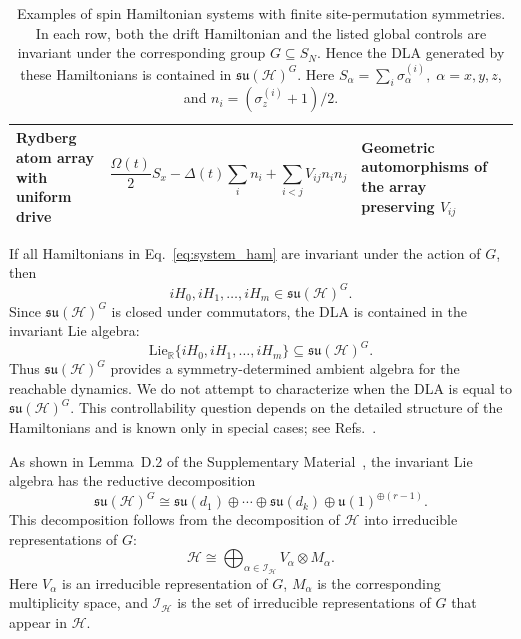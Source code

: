 \documentclass[10pt,twocolumn,superscriptaddress,aps,amsmath,amssymb,citeautoscript,floatfix,prx,longbibliography]{revtex4-2}
\newcounter{alg}
\theoremstyle{plain}
\theoremstyle{plain}
\theoremstyle{plain}
\theoremstyle{plain}
\theoremstyle{plain}
\theoremstyle{plain}
\begin{document}
\begin{table}[t]
\begin{tabular}{llll}
\parbox[t]{0.19\textwidth}{Rydberg atom array with uniform drive}
&
\parbox[t]{0.38\textwidth}{
\[
\frac{\Omega(t)}{2}S_x
-\Delta(t)\sum_i n_i
+\sum_{i<j}V_{ij}n_in_j
\]
}
&
\parbox[t]{0.22\textwidth}{
Geometric automorphisms of the array preserving \(V_{ij}\)
}
&
\parbox[t]{0.13\textwidth}{
\cite{Browaeys2020,Daley2022}
}
\\

\hline
\end{tabular}
\caption{
Examples of spin Hamiltonian systems with finite site-permutation symmetries. In each row, both the drift Hamiltonian and the listed global controls are invariant under the corresponding group \(G\subseteq S_N\). Hence the DLA generated by these Hamiltonians is contained in
\(\mathfrak{su}(\mathcal H)^G\). Here $S_{\alpha}=\sum_i \sigma_{\alpha}^{(i)}, \; \alpha=x, y, z$, and $n_i=\left(\sigma_z^{(i)}+1\right) / 2$.
}
\end{table}

If all Hamiltonians in Eq.~\eqref{eq:system_ham} are invariant under the action of $G$, then
$$
    iH_0,iH_1,\ldots,iH_m
    \in
    \mathfrak{su}(\mathcal H)^G .
$$
Since $\mathfrak{su}(\mathcal H)^G$ is closed under commutators, the DLA is contained in the invariant Lie algebra:
$$
    \mathrm{Lie}_{\mathbb R}
    \{iH_0,iH_1,\ldots,iH_m\}
    \subseteq
    \mathfrak{su}(\mathcal H)^G .
$$
Thus $\mathfrak{su}(\mathcal H)^G$ provides a symmetry-determined ambient algebra for the reachable dynamics. We do not attempt to characterize when the DLA is equal to $\mathfrak{su}(\mathcal H)^G$. This controllability question depends on the detailed structure of the Hamiltonians and is known only in special cases; see Refs.~\cite{Albertini2020, Kokcu2024, Wiersema2024}.

As shown in Lemma~D.2 of the Supplementary Material~\cite{SuppMat}, the invariant Lie algebra has the reductive decomposition
\begin{equation}\label{eq:inv_alg_decomp}
    \mathfrak{su}(\mathcal H)^G
    \cong
    \mathfrak{su}(d_1)
    \oplus
    \cdots
    \oplus
    \mathfrak{su}(d_k)
    \oplus
    \mathfrak{u}(1)^{\oplus(r-1)} .
\end{equation}
This decomposition follows from the decomposition of $\mathcal H$ into irreducible representations of $G$:
\begin{equation}\label{eq:H_G_irrep_decomp}
    \mathcal H
    \cong
    \bigoplus_{\alpha\in\mathcal I_{\mathcal H}}
    V_\alpha\otimes M_\alpha .
\end{equation}
Here $V_\alpha$ is an irreducible representation of $G$, $M_\alpha$ is the corresponding multiplicity space, and $\mathcal I_{\mathcal H}$ is the set of irreducible representations of $G$ that appear in $\mathcal H$.
\end{document}
